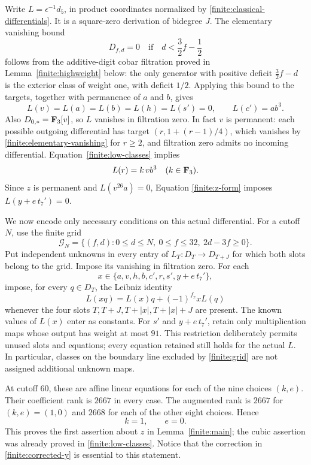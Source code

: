 Write $L=\epsilon^{-1}d_5$, in product coordinates normalized by
\eqref{finite:classical-differentials}.  It is a square-zero
derivation of bidegree $J$.  The elementary vanishing bound
\begin{equation}\label{finite:elementary-vanishing}
 D_{f,d}=0\quad\text{if}\quad d<\frac32f-\frac12
\end{equation}
follows from the additive-digit cobar filtration proved in
Lemma~\ref{finite:highweight} below: the only generator with positive
deficit $\frac32f-d$ is the exterior class of weight one, with
deficit $1/2$.  Applying this bound to the targets, together with
permanence of $a$ and $b$, gives
\[
 L(v)=L(a)=L(b)=L(h)=L(s')=0,\qquad L(c')=ab^3.
\]
Also $D_{0,*}=\mathbf F_3[v]$, so $L$ vanishes in filtration zero.
In fact $v$ is permanent: each possible outgoing differential has
target $(r,1+(r-1)/4)$, which vanishes by
\eqref{finite:elementary-vanishing} for $r\geq2$, and filtration
zero admits no incoming differential.
Equation~\eqref{finite:low-classes} implies
\[
 L(r)=k\,vb^3\quad(k\in\mathbf F_3).
\]
Since $z$ is permanent and $L(v^{26}a)=0$, Equation
\eqref{finite:z-form} imposes $L(y+e\,t_7')=0$.

We now encode only necessary conditions on this actual differential.
For a cutoff $N$, use the finite grid
\begin{equation}\label{finite:grid}
 \mathcal G_N=\{(f,d):0\leq d\leq N,\ 0\leq f\leq32,
                                  \ 2d-3f\geq0\}.
\end{equation}
Put independent unknowns in every entry of
$L_T\colon D_T\longrightarrow D_{T+J}$ for which both slots belong
to the grid.  Impose its vanishing in filtration zero.  For each
\[
 x\in\{a,v,h,b,c',r,s',y+e\,t_7'\},
\]
impose, for every $q\in D_T$, the Leibniz identity
\begin{equation}\label{finite:leibniz-equations}
 L(xq)=L(x)q+(-1)^{f_x}xL(q)
\end{equation}
whenever the four slots $T,T+J,T+|x|,T+|x|+J$ are present.  The
known values of $L(x)$ enter as constants.  For $s'$ and
$y+e\,t_7'$, retain only multiplication maps whose output has
weight at most $91$.  This restriction deliberately permits unused
slots and equations; every equation retained still holds for the
actual $L$.  In particular, classes on the boundary line excluded
by \eqref{finite:grid} are not assigned additional unknown maps.

At cutoff $60$, these are affine linear equations for each of the
nine choices $(k,e)$.  Their coefficient rank is $2667$ in every
case.  The augmented rank is $2667$ for $(k,e)=(1,0)$ and $2668$
for each of the other eight choices.  Hence
\begin{equation}\label{finite:forced-values}
 k=1,\qquad e=0.
\end{equation}
This proves the first assertion about $z$ in
Lemma~\ref{finite:main}; the cubic assertion was already proved in
\eqref{finite:low-classes}.  Notice that the correction in
\eqref{finite:corrected-y} is essential to this statement.

